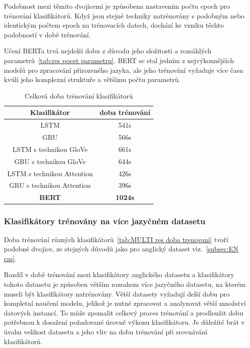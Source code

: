 Podobnost mezi těmito dvojicemi je způsobena nastavením počtu epoch pro trénování klasifikátorů.
Když jsou stejné techniky natrénovány s podobným nebo identickým počtem epoch na trénovacích datech, dochází ke vzniku těchto podobností v době trénování.

Učení BERTa trvá nejdelší dobu z důvodu jeho složitosti a rozsáhlých parametrů~\ref{tab:res pocet parametru}.
BERT se stal jedním z nejvýkonnějších modelů pro zpracování přirozeného jazyka, ale jeho trénování vyžaduje více času kvůli jeho komplexní struktuře a většímu počtu parametrů.

\begin{table}[H]
	\centering
	\caption{Celková doba trénování klasifikátorů}\label{tab:res doba trenovani}
	\begin{tabular}{ c c }
			\toprule
			Klasifikátor & doba trénování\\
			\midrule
			LSTM & 541s\\
			GRU & 566s\\         
			LSTM s technikou GloVe & 661s\\         
			GRU s technikou GloVe & 644s\\         
			LSTM s technikou Attention & 426s\\         
			GRU s technikou Attention & 396s\\         
			\textbf{BERT} & \textbf{1024s}\\         
			\midrule
		\end{tabular}
\end{table}

\subsubsection{Klasifikátory trénovány na více jazyčném datasetu}
Doba trénování různých klasifikátorů~\ref{tab:MULTI res doba trenovani} tvoří podobné dvojice, ze stejných důvodů jako pro anglický dataset viz.~\ref{subsec:EN cas}.

Rozdíl v době trénování mezi klasifikátory anglického datasetu a klasifikátory tohoto datasetu je způsoben větším rozsahem více jazyčného datasetu, na kterém museli být klasifikátory natrénovány.
Větší datasety vyžadují delší dobu pro kompletní naučení modelu, jelikož je nutné zpracovat a analyzovat větší množství datových instancí.
To může zpomalit celkový proces trénování a prodloužit dobu potřebnou k dosažení požadované úrovně výkonu klasifikátoru.
Je důležité brát v úvahu velikost datasetu a jeho vliv na dobu trénování při srovnávání klasifikátorů.

